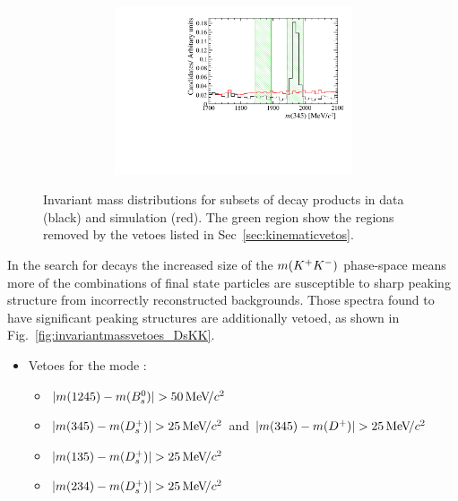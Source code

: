 \begin{figure}[!h]
\begin{subfigure}[t]{1.0\textwidth}
\begin{subfigure}[t]{0.32\textwidth}
         \includegraphics[width=1.0\textwidth]{figs/Selection/Veto_Comparison_B2DsPhi_Ds2KPiPi_m345.pdf}
      \end{subfigure}
      \caption{\decay{\Bp}{(\decay{\Dsp}{\Kp\pim\pip})\phiz}}
   \end{subfigure}

   \caption{Invariant mass distributions for subsets of decay products in data (black) and simulation (red). The green region show the regions removed by the vetoes listed in Sec~\ref{sec:kinematicvetos}.}
   \label{fig:invariantmassvetoes}   
\end{figure}


In the search for \decay{\Bp}{\Dsp\Kp\Km} decays the increased size of the $m({{K}^+}{{K}^-})$ phase-space means more of the combinations of final state particles are susceptible to sharp peaking structure from incorrectly reconstructed backgrounds. Those spectra found to have significant peaking structures are additionally vetoed, as shown in Fig.~\ref{fig:invariantmassvetoes_DsKK}.

\begin{itemize}
\item Vetoes for the mode \decay{\Bp}{(\decay{\Dsp}{\Kp\Km\pip})\Kp\Km}:
\begin{itemize}
\item $|m(\text{1245})- m({{B}^0_{s}})| > 50{\mathrm{\,Me\kern -0.1em V\!/}c^2}$
\item $|m(\text{345})- m({{D}^+_{s}})| > 25{\mathrm{\,Me\kern -0.1em V\!/}c^2}$ and $|m(\text{345})- m({{D}^+})| > 25{\mathrm{\,Me\kern -0.1em V\!/}c^2}$
\item $|m(\text{135})- m({{D}^+_{s}})| > 25{\mathrm{\,Me\kern -0.1em V\!/}c^2}$
\item $|m(\text{234})- m({{D}^+_{s}})| > 25{\mathrm{\,Me\kern -0.1em V\!/}c^2}$
\end{itemize}
\end{itemize}

